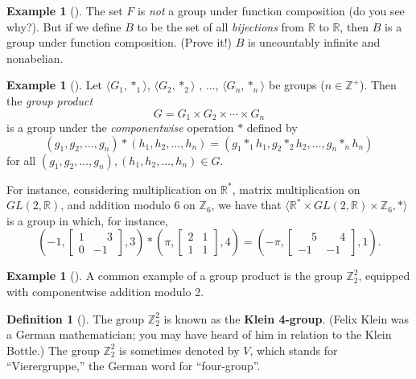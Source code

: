 \documentclass[10pt,]{book}
\newcommand{\terminology}[1]{\textbf{#1}}
\theoremstyle{plain}
\theoremstyle{definition}
\newtheorem{definition}[theorem]{Definition}
\theoremstyle{definition}
\theoremstyle{definition}
\newtheorem{example}[theorem]{Example}
\theoremstyle{definition}
\numberwithin{equation}{section}
\def\Z{\mathbb{Z}}
\def\R{\mathbb{R}}
\newcommand{\amp}{&}
\begin{document}
\begin{example}[]\label{example-20}
The set \(F\) is \emph{not} a group under function composition (do you see why?). But if we define \(B\) to be the set of all \emph{bijections} from \(\R\) to \(\R\), then \(B\) is a group under function composition. (Prove it!) \(B\) is uncountably infinite and nonabelian.%
\end{example}
\begin{example}[]\label{gpprod}
Let \(\langle G_1,*_1\rangle\), \(\langle G_2,*_2\rangle\) , \(\ldots\), \(\langle G_n,*_n\rangle\) be groups (\(n\in \Z^+\)). Then the \emph{group product}%
\begin{equation*}
G=G_1\times G_2\times \cdots \times G_n
\end{equation*}
is a group under the \emph{componentwise} operation \(*\) defined by%
\begin{equation*}
(g_1,g_2,\ldots, g_n)*(h_1,h_2,\ldots,h_n)=(g_1*_1h_1, g_2*_2h_2,\ldots, g_n*_nh_n)
\end{equation*}
for all \((g_1,g_2,\ldots, g_n),(h_1,h_2,\ldots,h_n)\in G\).%
\par
For instance, considering multiplication on \(\R^*\), matrix multiplication on \(GL(2,\R)\), and addition modulo \(6\) on \(\Z_6\), we have that \(\langle \R^*\times GL(2,\R) \times \Z_6,*\rangle\) is a group in which, for instance,%
\begin{equation*}
\left(-1, \begin{bmatrix}
1 \amp  \phantom{-}3 \\
0 \amp  -1
\end{bmatrix},
3\right)
*\left(\pi,
\begin{bmatrix}
2 \amp  1 \\
1 \amp  1
\end{bmatrix},
4\right)=\left(-\pi, 
\begin{bmatrix}
\phantom{-}5 \amp  \phantom{-}4 \\
-1 \amp -1
\end{bmatrix} 
,1\right).
\end{equation*}
%
\end{example}
\begin{example}[]\label{example-22}
A common example of a group product is the group \(\Z_2^2\), equipped with componentwise addition modulo 2.%
\end{example}
\begin{definition}[{}]\label{definition-29}
The group \(\Z_2^2\) is known as the \terminology{Klein 4-group}. (Felix Klein was a German mathematician; you may have heard of him in relation to the Klein Bottle.) The group \(\Z_2^2\) is sometimes denoted by \(V\), which stands for ``Vierergruppe,'' the German word for ``four-group''.%
\end{definition}
\typeout{************************************************}
\typeout{************************************************}
\end{document}
